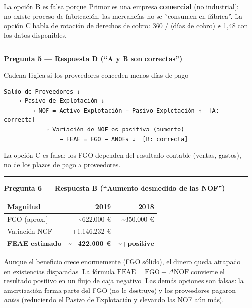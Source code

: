 \documentclass[12pt]{book} %
\begin{document}
La opción B es falsa porque Primor es una empresa \textbf{comercial} (no
industrial): no existe proceso de fabricación, las mercancías no se
``consumen en fábrica''. La opción C habla de rotación de derechos de
cobro: 360 / (días de cobro) ≠ 1,48 con los datos disponibles.

\begin{center}\rule{0.5\linewidth}{0.5pt}\end{center}

\textbf{Pregunta 5 --- Respuesta D (``A y B son correctas'')}

Cadena lógica si los proveedores conceden menos días de pago:

\begin{verbatim}
Saldo de Proveedores ↓
    → Pasivo de Explotación ↓
        → NOF = Activo Explotación − Pasivo Explotación ↑  [A: correcta]
            → Variación de NOF es positiva (aumento)
                → FEAE = FGO − ΔNOFs ↓  [B: correcta]
\end{verbatim}

La opción C es falsa: los FGO dependen del resultado contable (ventas,
gastos), no de los plazos de pago a proveedores.

\begin{center}\rule{0.5\linewidth}{0.5pt}\end{center}

\textbf{Pregunta 6 --- Respuesta B (``Aumento desmedido de las NOF'')}

\begin{longtable}[]{@{}lrr@{}}
\toprule\noalign{}
Magnitud & 2019 & 2018 \\
\midrule\noalign{}
\endhead
\bottomrule\noalign{}
\endlastfoot
FGO (aprox.) & \textasciitilde622.000 € & \textasciitilde350.000 € \\
Variación NOF & +1.146.232 € & --- \\
\textbf{FEAE estimado} & \textbf{\textasciitilde−422.000 €} &
\textbf{\textasciitilde+positive} \\
\end{longtable}

Aunque el beneficio crece enormemente (FGO sólido), el dinero queda
atrapado en existencias disparadas. La fórmula
\(\text{FEAE} = \text{FGO} - \Delta \text{NOF}\) convierte el resultado
positivo en un flujo de caja negativo. Las demás opciones son falsas: la
amortización forma parte del FGO (no lo destruye) y los proveedores
pagaron \emph{antes} (reduciendo el Pasivo de Explotación y elevando las
NOF aún más).
\end{document}
